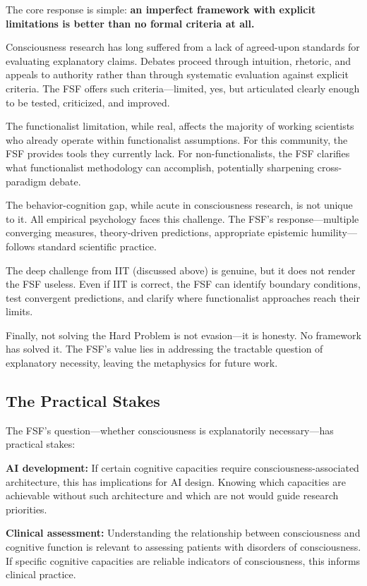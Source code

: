 \documentclass[12pt,a4paper]{article}
\begin{document}
The core response is simple: \textbf{an imperfect framework with explicit limitations is better than no formal criteria at all.}

Consciousness research has long suffered from a lack of agreed-upon standards for evaluating explanatory claims. Debates proceed through intuition, rhetoric, and appeals to authority rather than through systematic evaluation against explicit criteria. The FSF offers such criteria---limited, yes, but articulated clearly enough to be tested, criticized, and improved.

The functionalist limitation, while real, affects the majority of working scientists who already operate within functionalist assumptions. For this community, the FSF provides tools they currently lack. For non-functionalists, the FSF clarifies what functionalist methodology can accomplish, potentially sharpening cross-paradigm debate.

The behavior-cognition gap, while acute in consciousness research, is not unique to it. All empirical psychology faces this challenge. The FSF's response---multiple converging measures, theory-driven predictions, appropriate epistemic humility---follows standard scientific practice.

The deep challenge from IIT (discussed above) is genuine, but it does not render the FSF useless. Even if IIT is correct, the FSF can identify boundary conditions, test convergent predictions, and clarify where functionalist approaches reach their limits.

Finally, not solving the Hard Problem is not evasion---it is honesty. No framework has solved it. The FSF's value lies in addressing the tractable question of explanatory necessity, leaving the metaphysics for future work.

\subsection{The Practical Stakes}

The FSF's question---whether consciousness is explanatorily necessary---has practical stakes:

\textbf{AI development:} If certain cognitive capacities require consciousness-associated architecture, this has implications for AI design. Knowing which capacities are achievable without such architecture and which are not would guide research priorities.

\textbf{Clinical assessment:} Understanding the relationship between consciousness and cognitive function is relevant to assessing patients with disorders of consciousness. If specific cognitive capacities are reliable indicators of consciousness, this informs clinical practice.
\end{document}

